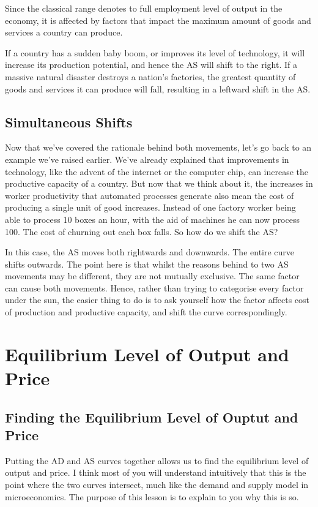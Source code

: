Since the classical range denotes to full employment level of output in the economy, it is affected by factors that impact the maximum amount of goods and services a country can produce. 

If a country has a sudden baby boom, or improves its level of technology, it will increase its production potential, and hence the AS will shift to the right. If a massive natural disaster destroys a nation’s factories, the greatest quantity of goods and services it can produce will fall, resulting in a leftward shift in the AS.
\subsection{Simultaneous Shifts}
Now that we’ve covered the rationale behind both movements, let’s go back to an example we’ve raised earlier. We’ve already explained that improvements in technology, like the advent of the internet or the computer chip, can increase the productive capacity of a country. But now that we think about it, the increases in worker productivity that automated processes generate also mean the cost of producing a single unit of good increases. Instead of one factory worker being able to process 10 boxes an hour, with the aid of machines he can now process 100. The cost of churning out each box falls. So how do we shift the AS?

In this case, the AS moves both rightwards and downwards. The entire curve shifts outwards. The point here is that whilst the reasons behind to two AS movements may be different, they are not mutually exclusive. The same factor can cause both movements. Hence, rather than trying to categorise every factor under the sun, the easier thing to do is to ask yourself how the factor affects cost of production and productive capacity, and shift the curve correspondingly.
\section{Equilibrium Level of Output and Price}
\subsection{Finding the Equilibrium Level of Ouptut and Price}
Putting the AD and AS curves together allows us to find the equilibrium level of output and price. I think most of you will understand intuitively that this is the point where the two curves intersect, much like the demand and supply model in microeconomics. The purpose of this lesson is to explain to you why this is so. 

